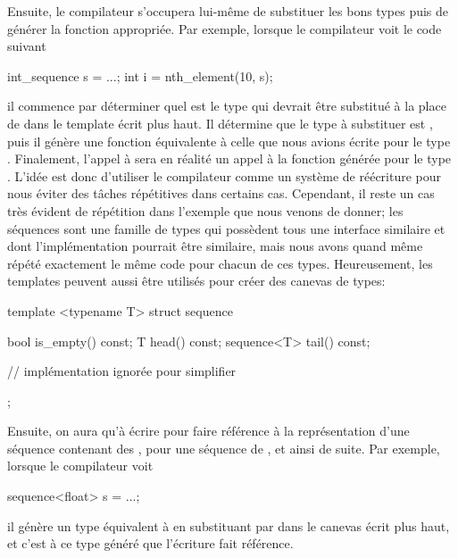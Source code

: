 Ensuite, le compilateur s'occupera lui-même de substituer les bons types puis
de générer la fonction appropriée. Par exemple, lorsque le compilateur voit le
code suivant
\begin{cpp}
    int_sequence s = ...;
    int i = nth_element(10, s);
\end{cpp}

il commence par déterminer quel est le type qui devrait être substitué à
la place de  dans le template écrit plus haut. Il détermine
que le type à substituer est , puis il génère une fonction
équivalente à celle que nous avions écrite pour le type .
Finalement, l'appel à  sera en réalité un appel à la
fonction générée pour le type . L'idée est donc
d'utiliser le compilateur comme un système de réécriture pour nous
éviter des tâches répétitives dans certains cas. Cependant, il reste un cas
très évident de répétition dans l'exemple que nous venons de donner; les
séquences sont une famille de types qui possèdent tous une interface similaire
et dont l'implémentation pourrait être similaire, mais nous avons quand même
répété exactement le même code pour chacun de ces types. Heureusement, les
templates peuvent aussi être utilisés pour créer des canevas de types:
\begin{cpp}
    template <typename T>
    struct sequence {
        bool is_empty() const;
        T head() const;
        sequence<T> tail() const;

        // implémentation ignorée pour simplifier
    };
\end{cpp}

Ensuite, on aura qu'à écrire  pour faire référence à la
représentation d'une séquence contenant des , 
pour une séquence de , et ainsi de suite. Par exemple, lorsque le
compilateur voit
\begin{cpp}
    sequence<float> s = ...;
\end{cpp}

il génère un type équivalent à  en substituant 
par  dans le canevas écrit plus haut, et c'est à ce type généré que
l'écriture  fait référence.

